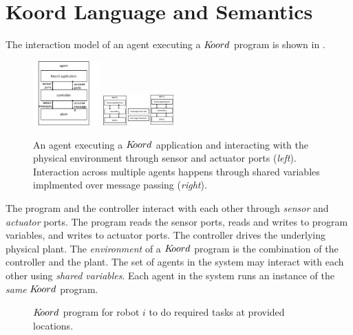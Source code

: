 \section{Koord Language and Semantics}
\label{sec:semantics}
The interaction model of an agent executing a $K\kern-2pt oord$ program is shown in . 
\begin{figure}[h!]
\centering
\includegraphics[width=0.23\textwidth]{figs/arch.png}
\includegraphics[width=0.24\textwidth]{figs/agents2.png}
\caption{\small An agent executing a $K\kern-2pt oord$ application and interacting with the physical environment through sensor and actuator ports ({\em left}). Interaction across multiple agents happens through shared variables implmented over message passing ({\em right}).}
\label{fig:arch}
\end{figure}
The program and the controller interact with each other through {\em sensor} and {\em actuator} ports.  The program reads the sensor ports, reads and writes to program variables, and writes to actuator ports. The controller drives the underlying physical plant. The \emph{environment} of a  $K\kern-2pt oord$ program is the combination of the controller and the plant. The set of agents in the system may interact with each other using {\em shared variables\/}. Each agent in the system runs an instance of the \emph{same} $K\kern-2pt oord$ program. 
\begin{figure}[ht!]
    \noindent
    \begin{mdframed}

    \begin{center}
        \scriptsize
        {}
        {}
    \end{center}
    \end{mdframed}

    \caption{$K\kern-2pt oord$ program for robot $i$ to do required tasks at provided locations.}
    \label{fig:taskapp}
\end{figure}
    
